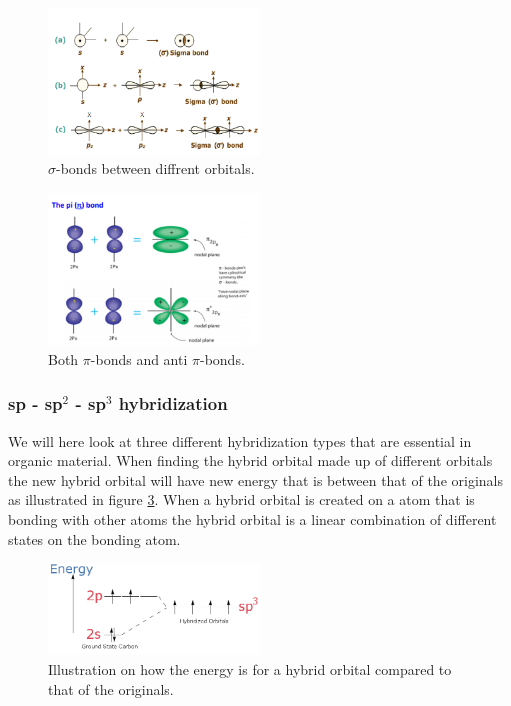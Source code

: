 \documentclass[jmp, amsmath, amssymb, reprint]{article}
\numberwithin{equation}{section}
\begin{document}
\begin{multicols}{2}
\begin{figure}[H]
	\centering
  	\includegraphics[width=0.50\textwidth]{sigma_bonds.png}
	\caption{\(\sigma\)-bonds between diffrent orbitals.}
	\label{fig:sigma_bonds}
\end{figure}

\begin{figure}[H]
	\centering
  	\includegraphics[width=0.50\textwidth]{pi_bonds.png}
	\caption{Both \(\pi\)-bonds and anti \(\pi\)-bonds.}
	\label{fig:pi_bonds}
\end{figure}

\subsubsection{sp - sp\(^2\) - sp\(^3\) hybridization}

We will here look at three different hybridization types that are essential in organic material. When finding the hybrid orbital made up of different orbitals the new hybrid orbital will have new energy that is between that of the originals as illustrated in figure \ref{fig:hybrid_energy}. When a hybrid orbital is created on a atom that is bonding with other atoms the hybrid orbital is a linear combination of different states on the bonding atom.

\begin{figure}[H]
	\centering
  	\includegraphics[width=0.50\textwidth]{hybrid_orbital_energy.png}%
	\caption{Illustration on how the energy is for a hybrid orbital compared to that of the originals.}
	\label{fig:hybrid_energy}
\end{figure}


\end{multicols}
\end{document}
